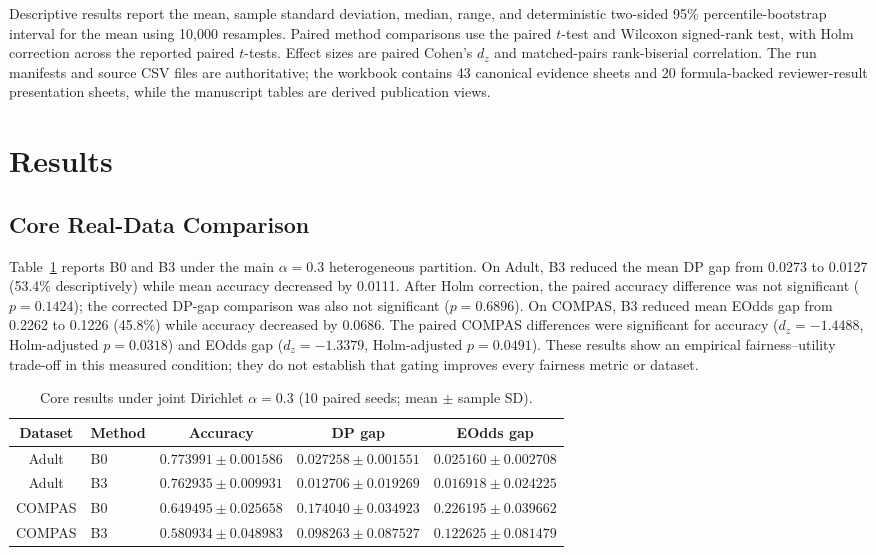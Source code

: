 \documentclass[futureinternet,article,submit,pdftex,moreauthors]{Definitions/mdpi}
\begin{document}
Descriptive results report the mean, sample standard deviation, median, range, and deterministic two-sided 95\% percentile-bootstrap interval for the mean using 10,000 resamples. Paired method comparisons use the paired \(t\)-test and Wilcoxon signed-rank test, with Holm correction across the reported paired \(t\)-tests. Effect sizes are paired Cohen's \(d_z\) and matched-pairs rank-biserial correlation. The run manifests and source CSV files are authoritative; the workbook contains 43 canonical evidence sheets and 20 formula-backed reviewer-result presentation sheets, while the manuscript tables are derived publication views.

\section{Results}
\label{sec:results}

\subsection{Core Real-Data Comparison}

Table~\ref{tab:results-core} reports B0 and B3 under the main \(\alpha=0.3\) heterogeneous partition. On Adult, B3 reduced the mean DP gap from 0.0273 to 0.0127 (53.4\% descriptively) while mean accuracy decreased by 0.0111. After Holm correction, the paired accuracy difference was not significant (\(p=0.1424\)); the corrected DP-gap comparison was also not significant (\(p=0.6896\)). On COMPAS, B3 reduced mean EOdds gap from 0.2262 to 0.1226 (45.8\%) while accuracy decreased by 0.0686. The paired COMPAS differences were significant for accuracy (\(d_z=-1.4488\), Holm-adjusted \(p=0.0318\)) and EOdds gap (\(d_z=-1.3379\), Holm-adjusted \(p=0.0491\)). These results show an empirical fairness--utility trade-off in this measured condition; they do not establish that gating improves every fairness metric or dataset.

\begin{table}[htpb]
	\caption{Core results under joint Dirichlet \(\alpha=0.3\) (10 paired seeds; mean \(\pm\) sample SD).}
	\label{tab:results-core}
	\centering
	\scriptsize
	\begin{tabular}{clccc}
		\toprule
		\textbf{Dataset} & \textbf{Method} & \textbf{Accuracy} & \textbf{DP gap} & \textbf{EOdds gap} \\
		\midrule
		Adult & B0 & $0.773991 \pm 0.001586$ & $0.027258 \pm 0.001551$ & $0.025160 \pm 0.002708$ \\
		Adult & B3 & $0.762935 \pm 0.009931$ & $0.012706 \pm 0.019269$ & $0.016918 \pm 0.024225$ \\
		COMPAS & B0 & $0.649495 \pm 0.025658$ & $0.174040 \pm 0.034923$ & $0.226195 \pm 0.039662$ \\
		COMPAS & B3 & $0.580934 \pm 0.048983$ & $0.098263 \pm 0.087527$ & $0.122625 \pm 0.081479$ \\
		\bottomrule
	\end{tabular}
\end{table}
\end{document}
